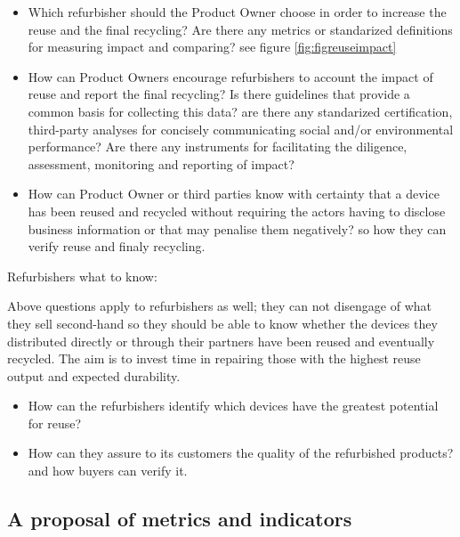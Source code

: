 \documentclass[
]{book}
\providecommand{\tightlist}{%
  \setlength{\itemsep}{0pt}\setlength{\parskip}{0pt}}
\begin{document}
\begin{itemize}
\tightlist
\item
  Which refurbisher should the Product Owner choose in order to increase the reuse and the final recycling? Are there any metrics or standarized definitions for measuring impact and comparing? see figure \ref{fig:figreuseimpact}
\item
  How can Product Owners encourage refurbishers to account the impact of reuse and report the final recycling? Is there guidelines that provide a common basis for collecting this data? are there any standarized certification, third-party analyses for concisely communicating social and/or environmental performance? Are there any instruments for facilitating the diligence, assessment, monitoring and reporting of impact?
\item
  How can Product Owner or third parties know with certainty that a device has been reused and recycled without requiring the actors having to disclose business information or that may penalise them negatively? so how they can verify reuse and finaly recycling.
\end{itemize}

Refurbishers what to know:

Above questions apply to refurbishers as well; they can not disengage of what they sell second-hand so they should be able to know whether the devices they distributed directly or through their partners have been reused and eventually recycled. The aim is to invest time in repairing those with the highest reuse output and expected durability.

\begin{itemize}
\tightlist
\item
  How can the refurbishers identify which devices have the greatest potential for reuse?
\item
  How can they assure to its customers the quality of the refurbished products? and how buyers can verify it.
\end{itemize}

\hypertarget{a-proposal-of-metrics-and-indicators}{%
\subsection{A proposal of metrics and indicators}\label{a-proposal-of-metrics-and-indicators}}
\end{document}
